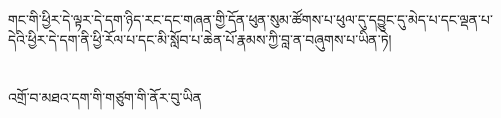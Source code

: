 གང་གི་ཕྱིར་དེ་ལྟར་དེ་དག་ཉིད་རང་དང་གཞན་གྱི་དོན་ཕུན་སུམ་ཚོགས་པ་ཕུལ་དུ་དབྱུང་དུ་མེད་པ་དང་ལྡན་པ་དེའི་ཕྱིར་དེ་དག་ནི་ཕྱི་རོལ་པ་དང་མི་སློབ་པ་ཆེན་པོ་རྣམས་ཀྱི་བླ་ན་བཞུགས་པ་ཡིན་ཏེ།\chapter{ }འགྲོ་བ་མཐའ་དག་གི་གཙུག་གི་ནོར་བུ་ཡིན